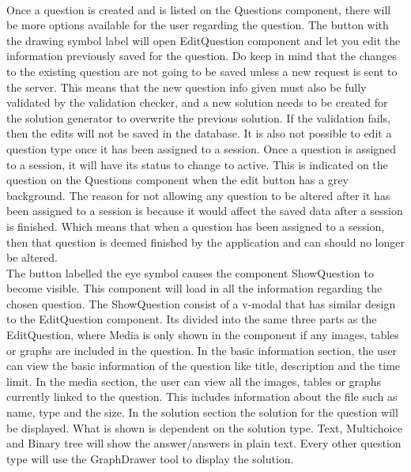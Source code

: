 \\[11pt]
Once a question is created and is listed on the Questions component, there will be more options available for the user regarding the question. The button with the drawing symbol label will open EditQuestion component and let you edit the information previously saved for the question. Do keep in mind that the changes to the existing question are not going to be saved unless a new request is sent to the server. This means that the new question info given must also be fully validated by the validation checker, and a new solution needs to be created for the solution generator to overwrite the previous solution. If the validation fails, then the edits will not be saved in the database. It is also not possible to edit a question type once it has been assigned to a session. Once a question is assigned to a session, it will have its status to change to active. This is indicated on the question on the Questions component when the edit button has a grey background. The reason for not allowing any question to be altered after it has been assigned to a session is because it would affect the saved data after a session is finished. Which means that when a question has been assigned to a session, then that question is deemed finished by the application and can should no longer be altered.
\\[11pt]
The button labelled the eye symbol causes the component ShowQuestion to become visible. This component will load in all the information regarding the chosen question. The ShowQuestion consist of a v-modal that has similar design to the EditQuestion component. Its divided into the same three parts as the EditQuestion, where Media is only shown in the component if any images, tables or graphs are included in the question. In the basic information section, the user can view the basic information of the question like title, description and the time limit. In the media section, the user can view all the images, tables or graphs currently linked to the question. This includes information about the file such as name, type and the size. In the solution section the solution for the question will be displayed. What is shown is dependent on the solution type. Text, Multichoice and Binary tree will show the answer/answers in plain text. Every other question type will use the GraphDrawer tool to display the solution. 
